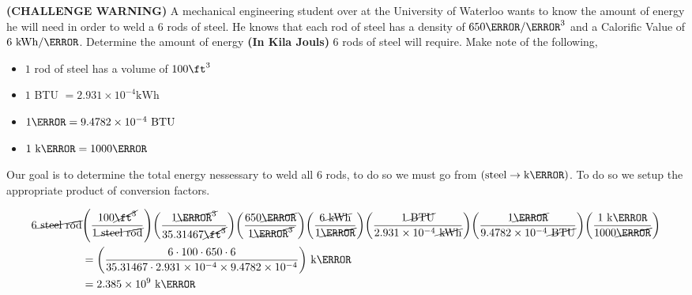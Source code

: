 \documentclass[11pt]{article} %
\begin{document}
\begin{qstn}[4]
    \textbf{(CHALLENGE WARNING)} A mechanical engineering student over at the University of Waterloo wants to
    know the amount of energy he will need in order to weld a $6$ rods of steel. He knows that each rod of
    steel has a density of $650 \kg / \m^3$ and a Calorific Value of $6 \text{ kWh} / \kg$. Determine the
    amount of energy \textbf{(In Kila Jouls)} $6$ rods of steel will require. Make note of the following,
    \begin{itemize}
        \item $1$ rod of steel has a volume of $100 \ft^3$
        \item $1$ BTU $= 2.931 \times 10^{-4} \text{kWh}$
        \item $1 \J = 9.4782 \times 10^{-4} \text{ BTU}$
        \item $1 \text{ k}\J = 1000 \J$
    \end{itemize}


\begin{soln}
Our goal is to determine the total energy nessessary to weld all 6 rods, to do so we must go from $(\text{steel} \rightarrow \text{k}\J)$. To do so we setup the appropriate product of conversion factors.

\begin{align*}
6\cancel{\text{ steel rod}}&\left(\frac{100\cancel{\ft^3}}{1 \cancel{\text{ steel rod}}} \right)\left(\frac{1 \cancel{\m^3}}{35.31467 \cancel{\ft^3}} \right) \left(\frac{650 \cancel{\kg}}{1 \cancel{\m^3}} \right) \left(\frac{6 \cancel{\text{ kWh}}}{1 \cancel{\kg}} \right) \left(\frac{1 \cancel{\text{ BTU}}}{2.931 \times 10^{-4}\cancel{\text{ kWh}}} \right) \left(\frac{1 \cancel{\J}}{9.4782 \times 10^{-4} \cancel{\text{ BTU}}} \right) \left(\frac{1 \text{ k}\J}{1000 \cancel{\J}}\right) \\
&= \left(\frac{6 \cdot 100 \cdot 650 \cdot 6}{35.31467 \cdot 2.931 \times 10^{-4} \times 9.4782 \times 10^{-4}} \right) \text{ k}\J\\
&= 2.385 \times 10^{9} \text{ k}\J
\end{align*}



\end{soln}



\end{qstn}
\end{document}

